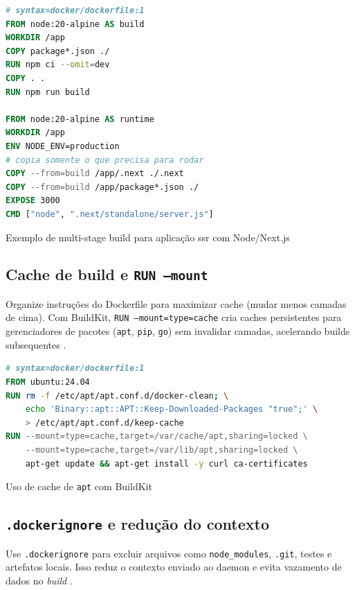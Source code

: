 \begin{codigo}[H]
\begin{lstlisting}[language=Dockerfile]
# syntax=docker/dockerfile:1
FROM node:20-alpine AS build
WORKDIR /app
COPY package*.json ./
RUN npm ci --omit=dev
COPY . .
RUN npm run build

FROM node:20-alpine AS runtime
WORKDIR /app
ENV NODE_ENV=production
# copia somente o que precisa para rodar
COPY --from=build /app/.next ./.next
COPY --from=build /app/package*.json ./
EXPOSE 3000
CMD ["node", ".next/standalone/server.js"]
\end{lstlisting}
\caption{Exemplo de multi-stage build para aplicação \acrshort{ssr} com Node/Next.js}
\label{lst:dockerfile-multistage}
\end{codigo}

\subsection{Cache de build e \texttt{RUN --mount}}
\label{subsec:cache-build}

Organize instruções do Dockerfile para maximizar cache (mudar menos camadas de cima). Com BuildKit, \texttt{RUN --mount=type=cache} cria caches persistentes para gerenciadores de pacotes (\texttt{apt}, \texttt{pip}, \texttt{go}) sem invalidar camadas, acelerando builds subsequentes \cite{dockerfile_ref}. 

\begin{codigo}[H]
\begin{lstlisting}[language=Dockerfile]
# syntax=docker/dockerfile:1
FROM ubuntu:24.04
RUN rm -f /etc/apt/apt.conf.d/docker-clean; \
    echo 'Binary::apt::APT::Keep-Downloaded-Packages "true";' \
    > /etc/apt/apt.conf.d/keep-cache
RUN --mount=type=cache,target=/var/cache/apt,sharing=locked \
    --mount=type=cache,target=/var/lib/apt,sharing=locked \
    apt-get update && apt-get install -y curl ca-certificates
\end{lstlisting}
\caption{Uso de cache de \texttt{apt} com BuildKit}
\label{lst:dockerfile-cache}
\end{codigo}

\subsection{\texttt{.dockerignore} e redução do contexto}
\label{subsec:dockerignore}

Use \texttt{.dockerignore} para excluir arquivos como \texttt{node\_modules}, \texttt{.git}, testes e artefatos locais. Isso reduz o contexto enviado ao daemon e evita vazamento de dados no \textit{build} \cite{dockerfile_ref}. 


